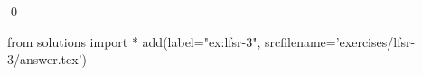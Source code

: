
\begin{ex} 
  \label{ex:lfsr-3}
  
  \qed
\end{ex} 
\begin{python0}
from solutions import *
add(label="ex:lfsr-3",
    srcfilename='exercises/lfsr-3/answer.tex') 
\end{python0}
